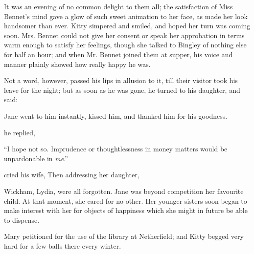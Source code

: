 It was an evening of no common delight to them all; the satisfaction of Miss Bennet's mind gave a glow of such sweet animation to her face, as made her look handsomer than ever. Kitty simpered and smiled, and hoped her turn was coming soon. Mrs. Bennet could not give her consent or speak her approbation in terms warm enough to satisfy her feelings, though she talked to Bingley of nothing else for half an hour; and when Mr. Bennet joined them at supper, his voice and manner plainly showed how really happy he was.

Not a word, however, passed his lips in allusion to it, till their visitor took his leave for the night; but as soon as he was gone, he turned to his daughter, and said:


Jane went to him instantly, kissed him, and thanked him for his goodness.

 he replied, 

“I hope not so. Imprudence or thoughtlessness in money matters would be unpardonable in {\em me}.”

 cried his wife,  Then addressing her daughter, 

Wickham, Lydia, were all forgotten. Jane was beyond competition her favourite child. At that moment, she cared for no other. Her younger sisters soon began to make interest with her for objects of happiness which she might in future be able to dispense.

Mary petitioned for the use of the library at Netherfield; and Kitty begged very hard for a few balls there every winter.


